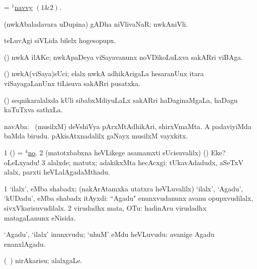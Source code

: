 \noindent
\gl{\pagu}
\bmng
{} = \hyperlink{navvy(1)}{$^1$navvy} \((1 \& 2)\). 
\emng
\eentry

\bentry
{}
\gl{\nA}
\bmng
(nwkAbaladavara uDupina) gADha niVlivaNaR; nwkAniVli. 
\emng
\eentry

\bentry
{}
\gl{\nA}
\bmng
teLuvAgi siVLida bilelx hogesopupx. 
\emng
\eentry

\bentry
{}
\gl{\nA}
\bmng
(\ame) nwkA ilAKe; nwkApaDeya viSayavanunx noVDikoLuLxva sakARri viBAga. 
\emng
\eentry

\bentry
{}
\gl{\nA}
\bmng
(\birx) nwkA(viSaya)sUci; elalx nwkA adhikArigaLa hesaranUnx itara viSayagaLanUnx tiLisuva sakARri pusatxka. 
\emng
\eentry

\bentry
{}
\gl{\nA}
\bmng
(\ame) seqnikaralalxda kUli sibabxMdiyuLaLx sakARri haDaginaMgaLa, haDagu kaTuTxva sathxLa. 
\emng
\eentry

\bentry
{}
\gl{\nA}
\bmng
navAba: 
\banum
{} \ca\ (musilxM) deVshiVya pArxMtAdhikAri, shirxVmaMta. 
 A padaviyiMda baMda birudu. 
 pAkisAtxnadalilx gaNayx musilxM vayxkitx. 
\eanum
\emng
\eentry

\bentry
{}
\gl{\kirxvi}
\bmng
\bnum
\num{1} (\pArxparx) = \hyperlink{no(4)}{$^4$no}. 
\num{2} (matotxbabxna heVLikege asamamxti sUcisuvalilx) (\pArxparx) Eke? oLeLxyadu! 
\num{3} alalxde; matutx; adakikxMta hecAcxgi:  tUkavAdadudx, aSeTxV alalx, parxti heVLalAgadaMthadu. 
\enum
\emng
\eentry

\bentry
{}
\gl{\nA}
\bmng
\bnum
\num{1} `ilalx', eMba shabadx; (nakArAtamxka utatxra heVLuvalilx) `ilalx', `Agadu', `kUDadu', eMba shabadx itAyxdi:  ``Agadu" enunxvudanunx avanu opupxvudilalx, sivxVkarisuvudilalx. 
\num{2} virudadhx mata, OTu:  hadinAru virudadhx matagaLanunx eNisida. 
\enum
\emng

\noindent
\gl{\pagu}
{ `Agadu', `ilalx' inunxvudu; `uhuM' eMdu heVLuvudu:  avanige Agadu enanxlAgadu.}\eentry

\bentry
{}
\gl{\kirx}
\bmng
 (\kanmu\ \ame) {\sakirx} nirAkarisu; alalxgaLe. 
\emng

